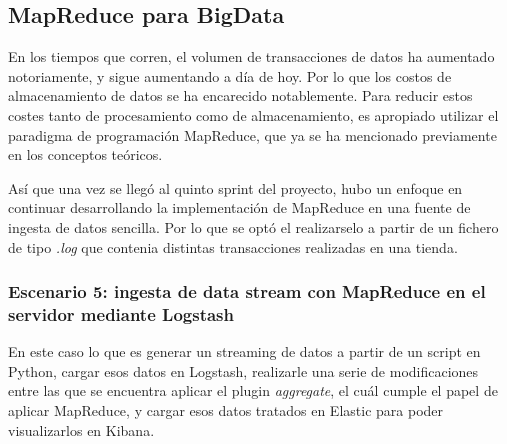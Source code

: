 \paragraph{ }
\paragraph{ }
\paragraph{ }
\paragraph{ }
\paragraph{ }
\paragraph{ }

\subsection{MapReduce para BigData}

En los tiempos que corren, el volumen de transacciones de datos ha aumentado notoriamente, y sigue aumentando a día de hoy. Por lo que los costos de almacenamiento de datos se ha encarecido notablemente. Para reducir estos costes tanto de procesamiento como de almacenamiento, es apropiado utilizar el paradigma de programación  MapReduce, que ya se ha mencionado previamente en los conceptos teóricos. 

Así que una vez se llegó al quinto sprint del proyecto, hubo un enfoque en continuar desarrollando la implementación de MapReduce en una fuente de ingesta de datos sencilla. Por lo que se optó el realizarselo a partir de un fichero de tipo \textit{.log} que contenia distintas transacciones realizadas en una tienda.

\subsubsection{Escenario 5: ingesta de data stream con MapReduce en el servidor mediante Logstash}

En este caso lo que es generar un streaming de datos a partir de un script en Python, cargar esos datos en Logstash, realizarle una serie de modificaciones entre las que se encuentra aplicar el plugin \textit{aggregate}, el cuál cumple el papel de aplicar MapReduce, y cargar esos datos tratados en Elastic para poder visualizarlos en Kibana.

